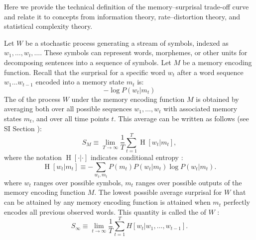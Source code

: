 Here we provide the technical definition of the memory--surprisal trade-off curve and relate it to concepts from information theory, rate--distortion theory, and statistical complexity theory.

Let $W$ be a stochastic process %
generating a stream of symbols, indexed as $w_1, \dots, w_t, \dots$. These symbols can represent words, morphemes, or other units for decomposing sentences into a sequence of symbols. 
Let $M$ be a memory encoding function.
Recall that the surprisal for a specific word $w_t$ after a word sequence $w_1 \dots w_{t-1}$ encoded into a memory state $m_t$ is:
\begin{equation}
    -\log P(w_t | m_t)
\end{equation}
The  of the process $W$ under the memory encoding function $M$ is obtained by averaging both over all possible sequences $w_1, \dots, w_t$ with associated memory states $m_t$, and over all time points $t$. This average can be written as follows (see SI Section \REF):
\begin{equation}
    S_M \equiv \lim_{T\rightarrow\infty} \frac{1}{T} \sum_{t=1}^T \operatorname{H}[w_t | m_t],
\end{equation}
where the notation $\operatorname{H}[\cdot | \cdot]$ indicates conditional entropy \citep[][p. 17]{cover2006elements}:
\begin{equation}
    \operatorname{H}[w_t|m_t] \equiv -\sum_{w_t,m_t} P(m_t) P(w_t|m_t) \log P(w_t|m_t).
\end{equation}
where $w_t$ ranges over possible symbols, $m_t$ ranges over possible outputs of the memory encoding function $M$.
The lowest possible average surprisal for $W$ that can be attained by any memory encoding function is attained when $m_t$ perfectly encodes all previous observed words.
This quantity is called the  of $W$ \citep[][pp. 74--75]{cover2006elements}:
\begin{equation}
    \label{eq:entropy-rate}
    S_\infty \equiv \lim_{t \rightarrow \infty} \frac{1}{T} \sum_{t=1}^T H[w_t | w_1, \dots, w_{t-1}].
\end{equation}
